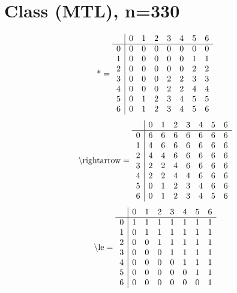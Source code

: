 \documentclass[11pt]{article}
\begin{document}
\section{Class (MTL), n=330}
\[\text{*} = 
\begin{array}{r | r r r r r r r}
 & 0 & 1 & 2 & 3 & 4 & 5 & 6 \\ \hline
0 & 0 & 0 & 0 & 0 & 0 & 0 & 0 \\
1 & 0 & 0 & 0 & 0 & 0 & 1 & 1 \\
2 & 0 & 0 & 0 & 0 & 0 & 2 & 2 \\
3 & 0 & 0 & 0 & 2 & 2 & 3 & 3 \\
4 & 0 & 0 & 0 & 2 & 2 & 4 & 4 \\
5 & 0 & 1 & 2 & 3 & 4 & 5 & 5 \\
6 & 0 & 1 & 2 & 3 & 4 & 5 & 6 \\
\end{array}
\]
\[\text{\textbackslash rightarrow} = 
\begin{array}{r | r r r r r r r}
 & 0 & 1 & 2 & 3 & 4 & 5 & 6 \\ \hline
0 & 6 & 6 & 6 & 6 & 6 & 6 & 6 \\
1 & 4 & 6 & 6 & 6 & 6 & 6 & 6 \\
2 & 4 & 4 & 6 & 6 & 6 & 6 & 6 \\
3 & 2 & 2 & 4 & 6 & 6 & 6 & 6 \\
4 & 2 & 2 & 4 & 4 & 6 & 6 & 6 \\
5 & 0 & 1 & 2 & 3 & 4 & 6 & 6 \\
6 & 0 & 1 & 2 & 3 & 4 & 5 & 6 \\
\end{array}
\]
\[\text{\textbackslash le} = 
\begin{array}{r | r r r r r r r}
 & 0 & 1 & 2 & 3 & 4 & 5 & 6 \\ \hline
0 & 1 & 1 & 1 & 1 & 1 & 1 & 1 \\
1 & 0 & 1 & 1 & 1 & 1 & 1 & 1 \\
2 & 0 & 0 & 1 & 1 & 1 & 1 & 1 \\
3 & 0 & 0 & 0 & 1 & 1 & 1 & 1 \\
4 & 0 & 0 & 0 & 0 & 1 & 1 & 1 \\
5 & 0 & 0 & 0 & 0 & 0 & 1 & 1 \\
6 & 0 & 0 & 0 & 0 & 0 & 0 & 1 \\
\end{array}
\]
\end{document}
